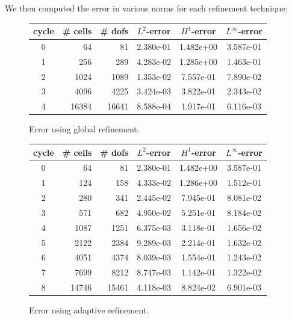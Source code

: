 \documentclass[9pt]{beamer}
\begin{document}
\begin{frame}
	We then computed the error in various norms for each refinement technique:
	\begin{figure}
		\begin{table}[H]
			\begin{center}
				\begin{tabular}{|c|r|r|c|c|c|} \hline
					cycle & \# cells & \# dofs & $L^2$-error & $H^1$-error &$L^\infty$-error\\ \hline
					0 & 64 & 81 & 2.380e-01 & 1.482e+00 & 3.587e-01\\ \hline
					1 & 256 & 289 & 4.283e-02 & 1.285e+00 & 1.463e-01\\ \hline
					2 & 1024 & 1089 & 1.353e-02 & 7.557e-01 & 7.890e-02\\ \hline
					3 & 4096 & 4225 & 3.424e-03 & 3.822e-01 & 2.343e-02\\ \hline
					4 & 16384 & 16641 & 8.588e-04 & 1.917e-01 & 6.116e-03\\ \hline
				\end{tabular}
			\end{center}
		\end{table}
		\caption{Error using global refinement.}
	\end{figure}
	\begin{figure}
		\begin{table}[H]
			\begin{center}
				\begin{tabular}{|c|r|r|c|c|c|} \hline
					cycle & \# cells & \# dofs &$L^2$-error & $H^1$-error & $L^\infty$-error\\ \hline
					0 & 64 & 81 & 2.380e-01 & 1.482e+00 & 3.587e-01\\ \hline
					1 & 124 & 158 & 4.333e-02 & 1.286e+00 & 1.512e-01\\ \hline
					2 & 280 & 341 & 2.445e-02 & 7.945e-01 & 8.081e-02\\ \hline
					3 & 571 & 682 & 4.950e-02 & 5.251e-01 & 8.184e-02\\ \hline
					4 & 1087 & 1251 & 6.375e-03 & 3.118e-01 & 1.656e-02\\ \hline
					5 & 2122 & 2384 & 9.289e-03 & 2.214e-01 & 1.632e-02\\ \hline
					6 & 4051 & 4374 & 8.039e-03 & 1.554e-01 & 1.243e-02\\ \hline
					7 & 7699 & 8212 & 8.747e-03 & 1.142e-01 & 1.322e-02\\ \hline
					8 & 14746 & 15461 & 4.118e-03 & 8.824e-02 & 6.901e-03\\ \hline
				\end{tabular}
			\end{center}
		\end{table}
		\caption{Error using adaptive refinement.}
	\end{figure}
\end{frame}
\end{document}
